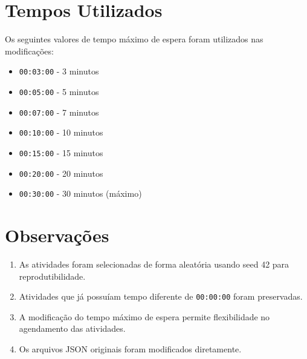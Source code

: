 \documentclass[12pt,a4paper]{article}
\begin{document}
\section{Tempos Utilizados}

Os seguintes valores de tempo máximo de espera foram utilizados nas modificações:

\begin{itemize}
    \item \texttt{00:03:00} - 3 minutos
    \item \texttt{00:05:00} - 5 minutos
    \item \texttt{00:07:00} - 7 minutos
    \item \texttt{00:10:00} - 10 minutos
    \item \texttt{00:15:00} - 15 minutos
    \item \texttt{00:20:00} - 20 minutos
    \item \texttt{00:30:00} - 30 minutos (máximo)
\end{itemize}

\section{Observações}

\begin{enumerate}
    \item As atividades foram selecionadas de forma aleatória usando seed 42 para reprodutibilidade.
    \item Atividades que já possuíam tempo diferente de \texttt{00:00:00} foram preservadas.
    \item A modificação do tempo máximo de espera permite flexibilidade no agendamento das atividades.
    \item Os arquivos JSON originais foram modificados diretamente.
\end{enumerate}
\end{document}
